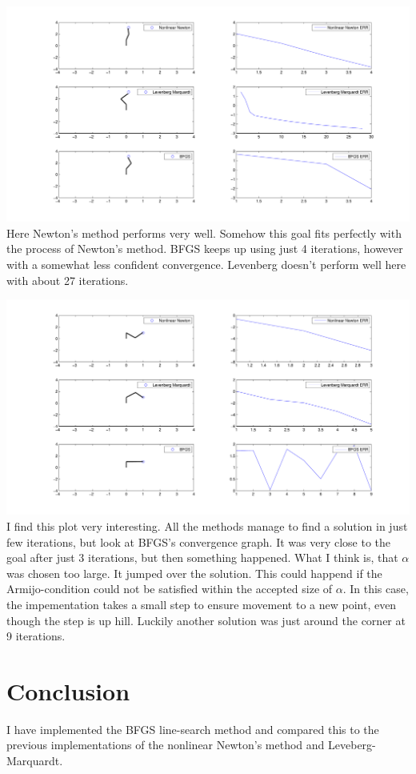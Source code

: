 \documentclass[10pt,oneside,a4paper,final,english]{memoir}
\begin{document}
\noindent
\includegraphics[width=\textwidth]{images/graph3.pdf}
Here Newton's method performs very well. Somehow this goal fits
perfectly with the process of Newton's method. BFGS keeps up using
just 4 iterations, however with a somewhat less confident
convergence. Levenberg doesn't perform well here with about 27
iterations.


\noindent
\includegraphics[width=\textwidth]{images/graph4.pdf}
I find this plot very interesting. All the methods manage to find a
solution in just few iterations, but look at BFGS's convergence graph.
It was very close to the goal after just 3 iterations, but then
something happened. What I think is, that $\alpha$ was chosen too
large. It jumped over the solution. This could happend if the
Armijo-condition could not be satisfied within the accepted size of
$\alpha$. In this case, the impementation takes a small step to ensure
movement to a new point, even though the step is up hill. Luckily
another solution was just around the corner at 9 iterations.


\section{Conclusion}
I have implemented the BFGS line-search method and compared this to
the previous implementations of the nonlinear Newton's method and
Leveberg-Marquardt.
\end{document}

